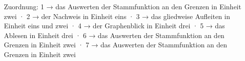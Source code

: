 
Zuordnung: 1 → das Auswerten der Stammfunktion an den Grenzen in Einheit zwei · 2 → der Nachweis in Einheit eins · 3 → das gliedweise Aufleiten in Einheit eins und zwei · 4 → der Graphenblick in Einheit drei · 5 → das Ablesen in Einheit drei · 6 → das Auswerten der Stammfunktion an den Grenzen in Einheit zwei · 7 → das Auswerten der Stammfunktion an den Grenzen in Einheit zwei

